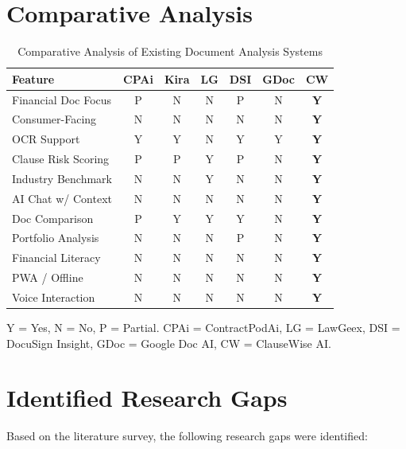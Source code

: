 \documentclass[12pt,a4paper,oneside]{report}
\begin{document}
\section{Comparative Analysis}

\begin{table}[htbp]
\centering
\caption{Comparative Analysis of Existing Document Analysis Systems}
\label{tab:comparative}
\small
\begin{tabular}{|p{3.2cm}|c|c|c|c|c|c|}
\hline
\textbf{Feature} & \textbf{CPAi} & \textbf{Kira} & \textbf{LG} & \textbf{DSI} & \textbf{GDoc} & \textbf{CW} \\
\hline
Financial Doc Focus & P & N & N & P & N & \textbf{Y} \\ \hline
Consumer-Facing & N & N & N & N & N & \textbf{Y} \\ \hline
OCR Support & Y & Y & N & Y & Y & \textbf{Y} \\ \hline
Clause Risk Scoring & P & P & Y & P & N & \textbf{Y} \\ \hline
Industry Benchmark & N & N & Y & N & N & \textbf{Y} \\ \hline
AI Chat w/ Context & N & N & N & N & N & \textbf{Y} \\ \hline
Doc Comparison & P & Y & Y & Y & N & \textbf{Y} \\ \hline
Portfolio Analysis & N & N & N & P & N & \textbf{Y} \\ \hline
Financial Literacy & N & N & N & N & N & \textbf{Y} \\ \hline
PWA / Offline & N & N & N & N & N & \textbf{Y} \\ \hline
Voice Interaction & N & N & N & N & N & \textbf{Y} \\ \hline
\end{tabular}

\vspace{0.3cm}
\footnotesize{Y = Yes, N = No, P = Partial. CPAi = ContractPodAi, LG = LawGeex, DSI = DocuSign Insight, GDoc = Google Doc AI, CW = ClauseWise AI.}
\end{table}

\section{Identified Research Gaps}

Based on the literature survey, the following research gaps were identified:
\end{document}
